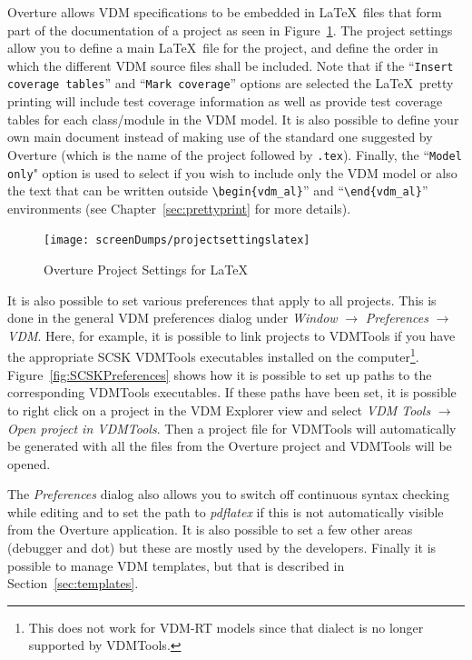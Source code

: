 \documentclass{overturerepchap}
\begin{document}
Overture allows VDM specifications to be embedded in \LaTeX\ files that
form part of the documentation of a project as seen in
Figure~\ref{fig:VDMSettingsLatex}. The project settings allow you
to define a main \LaTeX\ file for the project, and define the order in which the
different VDM source files shall be included. Note that if the
``\texttt{Insert coverage tables}'' and ``\texttt{Mark coverage}''
options are selected the \LaTeX\ pretty printing will include test
coverage information as well as provide test coverage tables for each
class/module in the VDM model. It is also possible to define your own
main document instead of making use of the standard one suggested by
Overture (which is the name of the project followed by \texttt{.tex}). 
Finally, the ``\texttt{Model only}" option is used to select if you 
wish to include only the VDM model or also the text that can be written
outside \verb+\begin{vdm_al}+'' and ``\verb+\end{vdm_al}+'' environments 
(see Chapter~\ref{sec:prettyprint} for more details).

\begin{figure}[!hbt]
\begin{center}
  \texttt{[image: screenDumps/projectsettingslatex]}
  \caption[Overture Project Settings]{Overture Project Settings for \LaTeX}
  \label{fig:VDMSettingsLatex}
\end{center}
\end{figure}

It is also possible to set various preferences that apply to
all projects. This is done in the general VDM preferences dialog under
\emph{Window} $\rightarrow$ \emph{Preferences} $\rightarrow$
\emph{VDM}. Here, for example, it is possible to link projects to
VDMTools if you have the appropriate SCSK VDMTools executables installed on
the computer\footnote{This does not work for VDM-RT models since that dialect is no longer supported by VDMTools.}. Figure~\ref{fig:SCSKPreferences} shows how it is possible to
set up paths to the corresponding VDMTools executables. If these paths have
been set, it is possible to right click on a project in the VDM
Explorer view and select \emph{VDM Tools} $\rightarrow$
\emph{Open project in VDMTools}. Then a project file for VDMTools
will automatically be generated with all the files from the Overture project
and VDMTools will be opened. 

The \emph{Preferences} dialog also
allows you to switch off continuous syntax checking while editing and
to set the path to \emph{pdflatex} if this is not automatically
visible from the Overture application. It is also possible to set a few
other areas (debugger and dot) but these are mostly used by the developers.
Finally it is possible to
manage VDM templates, but that is described in Section~\ref{sec:templates}.
\end{document}
